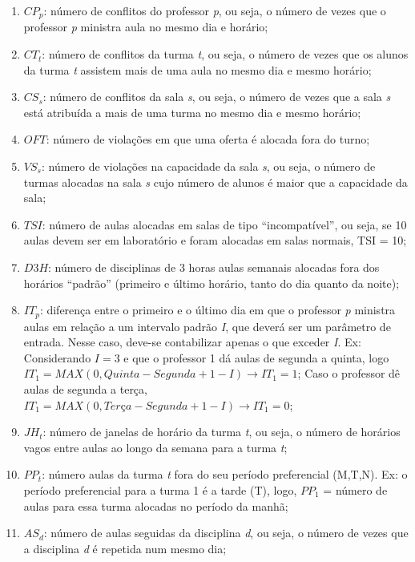\begin{enumerate}[leftmargin=1.5\parindent]
    \item \(CP_p\): número de conflitos do professor \textit{p}, ou seja, o número de vezes que o professor \textit{p} ministra aula no mesmo dia e horário;
    \item \(CT_t\): número de conflitos da turma \textit{t}, ou seja, o número de vezes que os alunos da turma \textit{t} assistem mais de uma aula no mesmo dia e mesmo horário;
    \item \(CS_s\): número de conflitos da sala \textit{s}, ou seja, o número de vezes que a sala \textit{s} está atribuída a mais de uma turma no mesmo dia e mesmo horário;
    \item \(OFT\): número de violações em que uma oferta é alocada fora do turno;
    \item \(VS_s\): número de violações na capacidade da sala \textit{s}, ou seja, o número de turmas alocadas na sala \textit{s} cujo número de alunos é maior que a capacidade da sala;
    \item \(TSI\): número de aulas alocadas em salas de tipo “incompatível”, ou seja, se 10 aulas devem ser em laboratório e foram alocadas em salas normais, TSI = 10;
    \item \(D3H\): número de disciplinas de 3 horas aulas semanais alocadas fora dos horários “padrão” (primeiro e último horário, tanto do dia quanto da noite);
	\item \(IT_p\): diferença entre o primeiro e o último dia em que o professor \textit{p} ministra aulas em relação a um intervalo padrão \textit{I}, que deverá ser um parâmetro de entrada. Nesse caso, deve-se contabilizar apenas o que exceder \textit{I}. Ex: Considerando \(I = 3\) e que o professor 1 dá aulas de segunda a quinta, logo \(IT_1 = MAX (0, Quinta - Segunda + 1 - I) \rightarrow IT_1 = 1\); Caso o professor dê aulas de segunda a terça, \(IT_1 = MAX (0, \textit{Terça} - Segunda + 1 - I) \rightarrow IT_1 = 0\);
	\item \(JH_t\): número de janelas de horário da turma \textit{t}, ou seja, o número de horários vagos entre aulas ao longo da semana para a turma \textit{t};
	\item \(PP_t\): número aulas da turma \textit{t} fora do seu período preferencial (M,T,N). Ex: o período preferencial para a turma 1 é a tarde (T), logo, \(PP_1\) = número de aulas para essa turma alocadas no período da manhã;
	\item \(AS_d\): número de aulas seguidas da disciplina \textit{d}, ou seja, o número de vezes que a disciplina \textit{d} é repetida num mesmo dia;

\end{enumerate}
